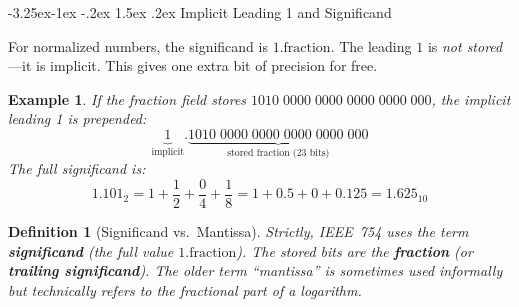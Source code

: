 \documentclass{article}
\makeatletter
\newtheorem{definition}[theorem]{Definition}
\newtheorem{example}{Example}[section]
\theoremstyle{remark}
\newlength{\subsecindent}
\renewcommand\subsection{\@startsection{subsection}{2}{\subsecindent}%
  {-3.25ex\@plus -1ex \@minus -.2ex}%
  {1.5ex \@plus .2ex}%
  {\normalfont\large\bfseries}}
\newenvironment{sub}{%
  \begin{list}{}{%
    \setlength{\leftmargin}{4em}%
    \setlength{\rightmargin}{0pt}%
    \setlength{\topsep}{0pt}%
    \setlength{\partopsep}{0pt}%
    \setlength{\parsep}{\parskip}%
    \setlength{\itemsep}{\parskip}%
  }\item\relax
}{\end{list}}
\makeatother
\begin{document}
\subsection{Implicit Leading 1 and Significand}
\begin{sub}
\begin{center}
\end{center}

For normalized numbers, the significand is $1.\text{fraction}$.  The leading
$1$ is \emph{not stored}---it is implicit.  This gives one extra bit of
precision for free.

\begin{example}
If the fraction field stores $1010\;0000\;0000\;0000\;0000\;000$, the
implicit leading 1 is prepended:
\[
  \underbrace{1}_{\text{implicit}}.\underbrace{1010\;0000\;0000\;0000\;0000\;000}_{\text{stored fraction (23 bits)}}
\]
The full significand is:
\[
  1.101_2 = 1 + \frac{1}{2} + \frac{0}{4} + \frac{1}{8}
           = 1 + 0.5 + 0 + 0.125 = 1.625_{10}
\]
\end{example}

\begin{definition}[Significand vs.\ Mantissa]
Strictly, IEEE~754 uses the term \textbf{significand} (the full value
$1.\text{fraction}$).  The stored bits are the \textbf{fraction} (or
\textbf{trailing significand}).  The older term ``mantissa'' is sometimes used
informally but technically refers to the fractional part of a logarithm.
\end{definition}
\end{sub}

\end{document}
